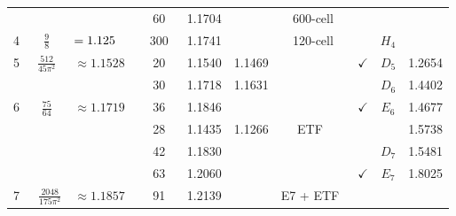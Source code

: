 \documentclass[10pt,aps,notitlepage,onecolumn,pra,superscriptaddress]{revtex4-1}
\newcommand{\cc}{\cellcolor[gray]{0.9}}
\begin{document}
\begin{table}[ht!]
\begin{tabular}{|c|cl|c|c|c|c|c|c|c|}
                        &                                            &                                        & 60                  & \cc1.1704   &            & 600-cell              &              &                         &           \\ \cline{4-8}\cline{10-10}
    \multirow{-3}{*}{4} & \multirow{-3}{*}{$\frac98$}                & \multirow{-3}{*}{$=1.125\hphantom{0}$} & ~300~               & 1.1741      &            & 120-cell              &              & \multirow{-2}{*}{$H_4$} &           \\ \hline
    5                   & $\frac{512}{45\pi^2}$                      & $\approx1.1528$                        & 20                  & \cc1.1540   & 1.1469     &                       & $\checkmark$ & $D_5$                   & 1.2654    \\ \hline
                        &                                            &                                        & 30                  & 1.1718      & 1.1631     &                       &              & $D_6$                   & 1.4402    \\ \cline{4-10}
    \multirow{-2}{*}{6} & \multirow{-2}{*}{$\frac{75}{64}$}          & \multirow{-2}{*}{$\approx1.1719$}      & 36                  & \cc1.1846   &            &                       & $\checkmark$ & $E_6$                   & 1.4677    \\ \hline
                        &                                            &                                        & 28                  & 1.1435      & 1.1266     & ETF~\cite{LS66}       &              &                         & 1.5738    \\ \cline{4-10}
                        &                                            &                                        & 42                  & 1.1830      &            &                       &              & $D_7$                   & 1.5481    \\ \cline{4-10}
                        &                                            &                                        & 63                  & \cc1.2060   &            &                       & $\checkmark$ & $E_7$                   & 1.8025    \\ \cline{4-10}
    \multirow{-4}{*}{7} & \multirow{-4}{*}{~$\frac{2048}{175\pi^2}$} & \multirow{-4}{*}{$\approx1.1857$~}     & 91                  & \cc1.2139   &            & E7 + ETF~\cite{FJM18} &              &                         &           \\ \hline

\end{tabular}
\end{table}
\end{document}
